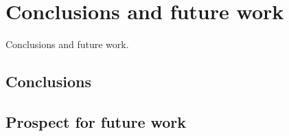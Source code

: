 \chapter{Conclusions and future work}
Conclusions and future work.

\section{Conclusions}

\section{Prospect for future work}
		